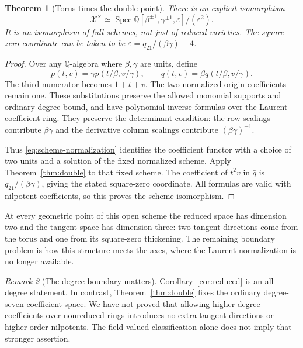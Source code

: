 \documentclass[11pt,a4paper]{article}
\numberwithin{equation}{section}
\newtheorem{theorem}{Theorem}[section]
\theoremstyle{definition}
\theoremstyle{remark}
\newtheorem{remark}[theorem]{Remark}
\newcommand{\Q}{\mathbb{Q}}
\newcommand{\Spec}{\operatorname{Spec}}
\newcommand{\eps}{\varepsilon}
\begin{document}
\begin{theorem}[Torus times the double point]\label{thm:torusdouble}
There is an explicit isomorphism
\begin{equation}\label{eq:torusdouble}
\mathcal X^{\times}\simeq
\Spec\Q[\beta^{\pm1},\gamma^{\pm1},\eps]/(\eps^2).
\end{equation}
It is an isomorphism of full schemes, not just of reduced varieties.
The square-zero coordinate can be taken to be
$\eps=q_{21}/(\beta\gamma)-4$.
\end{theorem}
\begin{proof}
Over any $\Q$-algebra where $\beta,\gamma$ are units, define
\begin{equation}\label{eq:scheme-normalization}
\bar p(t,v)=\gamma p(t/\beta,v/\gamma),\qquad
\bar q(t,v)=\beta q(t/\beta,v/\gamma).
\end{equation}
The third numerator becomes $1+t+v$. The two normalized origin
coefficients remain one. These substitutions preserve the allowed
monomial supports and ordinary degree bound, and have polynomial inverse
formulas over the Laurent coefficient ring. They preserve the determinant
condition: the row scalings contribute $\beta\gamma$ and the derivative
column scalings contribute $(\beta\gamma)^{-1}$.

Thus \eqref{eq:scheme-normalization} identifies the coefficient functor
with a choice of two units and a solution of the fixed normalized scheme.
Apply Theorem~\ref{thm:double} to that fixed scheme. The coefficient of
$t^2v$ in $\bar q$ is $q_{21}/(\beta\gamma)$, giving the stated
square-zero coordinate. All formulas are valid with nilpotent
coefficients, so this proves the scheme isomorphism.
\end{proof}

At every geometric point of this open scheme the reduced space has
dimension two and the tangent space has dimension three: two tangent
directions come from the torus and one from its square-zero thickening.
The remaining boundary problem is how this structure meets the axes,
where the Laurent normalization is no longer available.

\begin{remark}[The degree boundary matters]
Corollary~\ref{cor:reduced} is an all-degree statement. In contrast,
Theorem~\ref{thm:double} fixes the ordinary degree-seven coefficient space.
We have not proved that allowing higher-degree coefficients over
nonreduced rings introduces no extra tangent directions or higher-order
nilpotents. The field-valued classification alone does not imply that
stronger assertion.
\end{remark}
\end{document}
